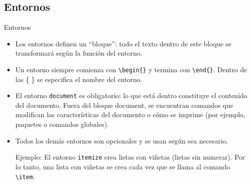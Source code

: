 \documentclass[12pt]{beamer}
\begin{document}
\subsection{Entornos}
\begin{frame}{Entornos}
  \begin{itemize}
    \item<1-> Los entornos definen un ``bloque'': todo el texto dentro de este bloque se transformará según la función del entorno.
    \item<2-> Un entorno siempre comienza con {\color{blue}\texttt{\textbackslash begin\{\}}} y termina con {\color{blue}\texttt{\textbackslash end\{\}}}. Dentro de las {\color{blue}\{ \}} se especifica el nombre del entorno.
    \item<3-> El entorno {\color{blue}\texttt{document}} es obligatorio: lo que está dentro constituye el contenido del documento. Fuera del bloque document, se encuentran comandos que modifican las características del documento o cómo se imprime (por ejemplo, paquetes o comandos globales).
    \item <4-> Todos los demás entornos son opcionales y se usan según sea necesario.
    
    {\color{red}Ejemplo}:
    El entorno {\color{blue}\texttt{itemize}} crea listas con viñetas (listas sin numerar). Por lo tanto, una lista con viñetas se crea cada vez que se llama al comando {\color{blue}\texttt{\textbackslash item}}.
  \end{itemize}
\end{frame}
\end{document}

